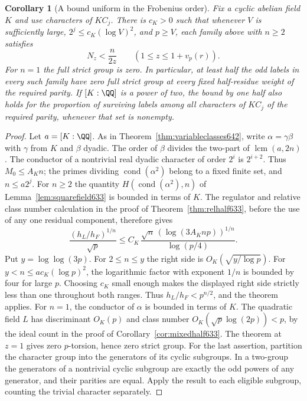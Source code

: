 \documentclass[a4paper,11pt]{article}
\newtheorem{corollary}[proposition]{Corollary}
\theoremstyle{definition}
\theoremstyle{remark}
\numberwithin{equation}{section}
\begin{document}
\begin{corollary}[A bound uniform in the Frobenius order]
\leavevmode\label{cor:allhalfprimes643}
Fix a cyclic abelian field \(K\) and use characters of \(K C_j\).
There is \(c_K>0\) such that whenever \(V\) is sufficiently
large, \(2^j\le c_K(\log V)^2\), and \(p\ge V\), each family
above with \(n\ge2\) satisfies
\[
              N_z<\frac{n}{2z}
                        \qquad(1\le z\le1+v_p(r)).
\]
For \(n=1\) the full strict group is zero. In particular, at
least half the odd labels in every such family have zero full
strict group at every fixed half-residue weight of the required
parity. If \([K:\QQ]\) is a power of two, the bound by one
half also holds for the proportion of surviving labels among
all characters of \(K C_j\) of the required parity, whenever
that set is nonempty.
\end{corollary}
\begin{proof}
Let \(a=[K:\QQ]\). As in
Theorem~\ref{thm:variableclasses642}, write \(\alpha=\gamma\beta\)
with \(\gamma\) from \(K\) and \(\beta\) dyadic. The order of
\(\beta\) divides the two-part of \(\operatorname{lcm}(a,2n)\).
The conductor of a nontrivial real dyadic character of order
\(2^i\) is \(2^{i+2}\). Thus \(M_0\le A_K n\);
the primes dividing \(\operatorname{cond}(\alpha^2)\) belong
to a fixed finite set, and \(n\le a2^j\). For \(n\ge2\) the
quantity \(H(\operatorname{cond}(\alpha^2),n)\) of
Lemma~\ref{lem:squarefield633} is bounded in terms of \(K\).
The regulator and relative class number calculation in the
proof of Theorem~\ref{thm:relhalf633}, before the use of any
one residual component, therefore gives
\[
   \frac{(h_L/h_F)^{1/n}}{\sqrt p}
        \le C_K\,\frac{\sqrt n\,(\log(3A_K n p))^{1/n}}
                              {\log(p/4)} .
\]
Put \(y=\log\log(3p)\). For \(2\le n\le y\) the right side
is \(O_K(\sqrt{y/\log p})\). For \(y<n\le a c_K(\log p)^2\),
the logarithmic factor with exponent \(1/n\) is bounded by
four for large \(p\). Choosing \(c_K\) small enough makes
the displayed right side strictly less than one throughout
both ranges. Thus \(h_L/h_F<p^{n/2}\), and the theorem applies.
For \(n=1\), the conductor of \(\alpha\) is bounded in terms
of \(K\). The quadratic field \(L\) has discriminant \(O_K(p)\)
and class number \(O_K(\sqrt p\log(2p))<p\), by the ideal
count in the proof of Corollary~\ref{cor:mixedhalf633}.
The theorem at \(z=1\) gives zero \(p\)-torsion, hence zero
strict group. For the last assertion, partition the character
group into the generators of its cyclic subgroups. In a
two-group the generators of a nontrivial cyclic subgroup
are exactly the odd powers of any generator, and their parities
are equal. Apply the result to each eligible subgroup, counting
the trivial character separately.
\end{proof}
\end{document}
